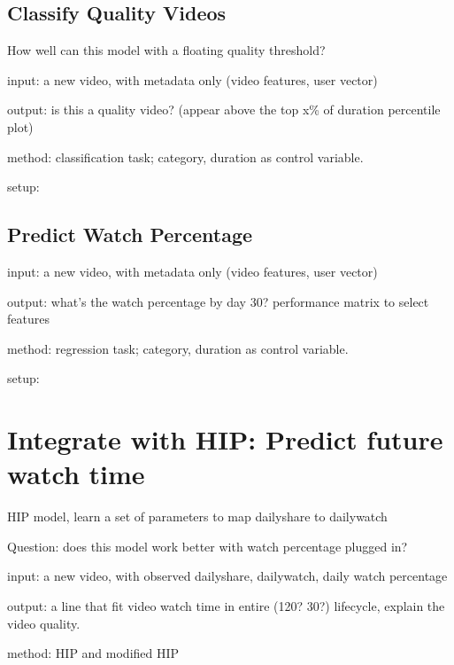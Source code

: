 \subsection{Classify Quality Videos}
How well can this model with a floating quality threshold?

input: a new video, with metadata only (video features, user vector)

output: is this a quality video? (appear above the top x\% of duration percentile plot)

method: classification task; category, duration as control variable.

setup: 

\subsection{Predict Watch Percentage}
input: a new video, with metadata only (video features, user vector)

output: what's the watch percentage by day 30? performance matrix to select features

method: regression task; category, duration as control variable.

setup: 


\section{Integrate with HIP: Predict future watch time}
HIP model, learn a set of parameters to map dailyshare to dailywatch

Question: does this model work better with watch percentage plugged in?

input: a new video, with observed dailyshare, dailywatch, daily watch percentage

output: a line that fit video watch time in entire (120? 30?) lifecycle, explain the video quality.

method: HIP and modified HIP



